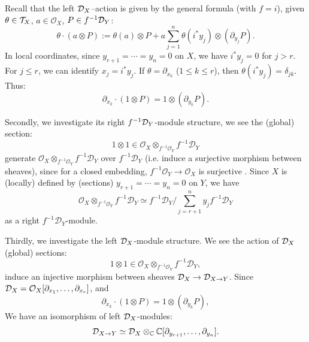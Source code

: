 \begin{example}
\begin{enumerate}
              Recall that the left $\mathcal{D}_X$--action is given by the general formula (with $f=i$), given $\theta \in \mathcal{T}_X$, $a \in \mathcal{O}_X$, $P \in f^{-1}\mathcal{D}_Y$:
              \[
                  \theta \cdot (a \otimes P) := \theta(a) \otimes P + a \sum_{j=1}^n \theta(i^* y_j) \otimes (\partial_{y_j} P).
              \]
              In local coordinates, since $y_{r+1} = \cdots = y_n = 0$ on $X$, we have $i^* y_j = 0$ for $j > r$.
              For $j \le r$, we can identify $x_j = i^* y_j$. If $\theta = \partial_{x_k}$ ($1 \le k \le r$), then $\theta(i^* y_j) = \delta_{jk}$.
              Thus:
              \[
                  \partial_{x_k} \cdot (1 \otimes P) = 1 \otimes (\partial_{y_k} P).
              \]

              Secondly, we investigate its right $f^{-1}\mathcal{D}_Y$-module structure, we see the (global) section:
              \[
                  1\otimes 1\in \mathcal{O}_X \otimes_{f^{-1}\mathcal{O}_Y} f^{-1}\mathcal{D}_Y
              \]
              generate $\mathcal{O}_X \otimes_{f^{-1}\mathcal{O}_Y} f^{-1}\mathcal{D}_Y$ over $f^{-1}\mathcal{D}_Y$ (i.e. induce a surjective morphism between sheaves), since for a closed embedding,
              $f^{-1}\mathcal{O}_Y \to \mathcal{O}_X$ is surjective \cite[\href{https://stacks.math.columbia.edu/tag/01HK}{Tag 01HK}, \href{https://stacks.math.columbia.edu/tag/01B2}{Tag 01B2}]{stacks-project}.
              Since $X$ is (locally) defined by (sections) $y_{r+1} = \cdots = y_n = 0$ on $Y$, we have
              \[
                  \mathcal O_X \otimes_{f^{-1}\mathcal O_Y} f^{-1}\mathcal D_Y \simeq f^{-1}\mathcal D_Y \Big/ \sum_{j=r+1}^n y_j f^{-1}\mathcal D_Y
              \]
              as a right $f^{-1}\mathcal D_Y$-module.

              Thirdly, we investigate the left $\mathcal{D}_X$-module structure. We see the action of $\mathcal{D}_X$ (global) sections:
              \[
                  1\otimes 1 \in \mathcal{O}_X \otimes_{f^{-1}\mathcal{O}_Y} f^{-1}\mathcal{D}_Y,
              \]
              induce an injective morphism between sheaves $\mathcal{D}_X \to \mathcal{D}_{X \to Y}$. Since $\mathcal{D}_X = \mathcal{O}_X [\partial_{x_1}, \dots, \partial_{x_r}]$, and
              \[
                  \partial_{x_k} \cdot (1 \otimes P) = 1 \otimes (\partial_{y_k} P),
              \]
              We have an isomorphism of left $\mathcal{D}_X$-modules:
              \[
                  \mathcal{D}_{X \to Y} \simeq \mathcal{D}_X \otimes_{\mathbb{C}} \mathbb{C}[\partial_{y_{r+1}}, \dots, \partial_{y_n}].
              \]


\end{enumerate}
\end{example}
